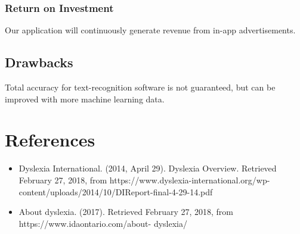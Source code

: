 \documentclass[a4paper]{article}
\begin{document}
\subsubsection{Return on Investment}
Our application will continuously generate revenue from in-app advertisements.


\subsection{Drawbacks}
Total accuracy for text-recognition software is not guaranteed, but can be improved with more machine learning data. 


\newpage

\section{References}

\begin{itemize}
   \item Dyslexia International. (2014, April 29). Dyslexia Overview. Retrieved February 27, 2018, from https://www.dyslexia-international.org/wp-content/uploads/2014/10/DIReport-final-4-29-14.pdf
   
   \item About dyslexia. (2017). Retrieved February 27, 2018, from https://www.idaontario.com/about-      dyslexia/
\end{itemize}
\end{document}
